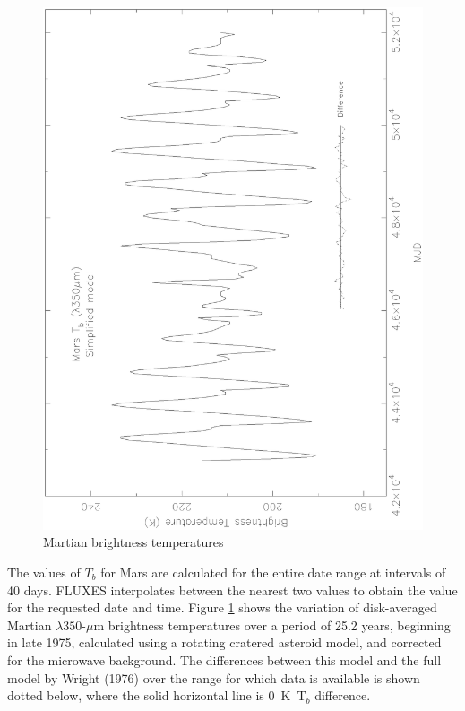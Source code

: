 \documentclass[11pt,twoside]{article}
\renewcommand{\_}{\texttt{\symbol{95}}}
\begin{document}
\begin{figure}
\includegraphics[angle=-90,width=\textwidth]{sun213_fig1.eps}
\vspace*{-0.5cm}
\caption{Martian brightness temperatures}
\label{fig:mars}
\end{figure}
 
The values of $T_b$ for Mars are calculated for the entire date range
at intervals of 40 days. FLUXES interpolates between the nearest two
values to obtain the value for the requested date and time. 
Figure \ref{fig:mars} shows the variation of disk-averaged Martian $\lambda350$-$\mu$m 
brightness temperatures over a period of 25.2 years, beginning in late 1975, 
calculated using a rotating cratered asteroid model, and corrected for the 
microwave background. The differences between this model and the full model 
by Wright (1976) over the range for which data is available is shown 
dotted below, where the solid horizontal line is 0~K~T$_b$ difference.
\end{document}

